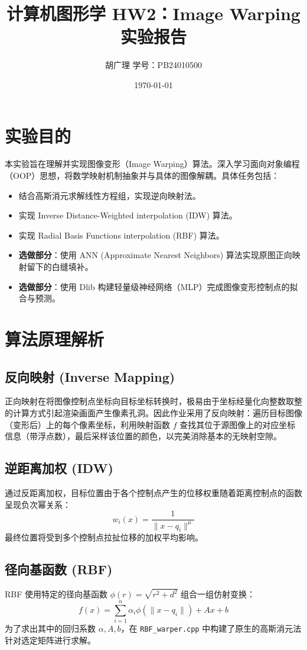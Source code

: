 \documentclass[12pt,a4paper]{ctexart}
\title{计算机图形学 HW2：Image Warping 实验报告}
\author{胡广理 \quad 学号：PB24010500}
\date{\today}
\begin{document}
\maketitle

\section{实验目的}
本实验旨在理解并实现图像变形（Image Warping）算法。深入学习面向对象编程（OOP）思想，将数学映射机制抽象并与具体的图像解耦。具体任务包括：
\begin{itemize}
    \item 结合高斯消元求解线性方程组，实现逆向映射法。
    \item 实现 Inverse Distance-Weighted interpolation (IDW) 算法。
    \item 实现 Radial Basis Functions interpolation (RBF) 算法。
    \item \textbf{选做部分}：使用 ANN (Approximate Nearest Neighbors) 算法实现原图正向映射留下的白缝填补。
    \item \textbf{选做部分}：使用 Dlib 构建轻量级神经网络（MLP）完成图像变形控制点的拟合与预测。
\end{itemize}

\section{算法原理解析}
\subsection{反向映射 (Inverse Mapping)}
正向映射在将图像控制点坐标向目标坐标转换时，极易由于坐标经量化向整数取整的计算方式引起渲染画面产生像素孔洞。因此作业采用了反向映射：遍历目标图像（变形后）上的每个像素坐标，利用映射函数 $f$ 查找其位于源图像上的对应坐标信息（带浮点数），最后采样该位置的颜色，以完美消除基本的无映射空隙。

\subsection{逆距离加权 (IDW)}
通过反距离加权，目标位置由于各个控制点产生的位移权重随着距离控制点的函数呈现负次幂关系：
$$w_i(x) = \frac{1}{\| x - q_i \|^\mu}$$
最终位置将受到多个控制点拉扯位移的加权平均影响。

\subsection{径向基函数 (RBF)}
RBF 使用特定的径向基函数 $\phi(r) = \sqrt{r^2 + d^2}$ 组合一组仿射变换：
$$f(x) = \sum_{i=1}^n \alpha_i \phi(\|x - q_i\|) + A x + b$$
为了求出其中的回归系数 $\alpha, A, b$，在 \verb|RBF_warper.cpp| 中构建了原生的高斯消元法针对选定矩阵进行求解。
\end{document}
